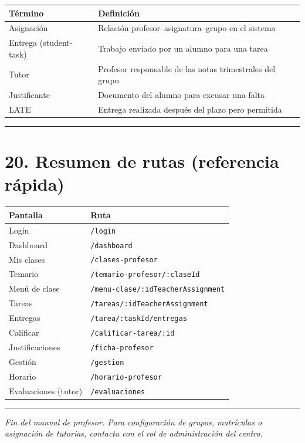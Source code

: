\documentclass[
  spanish,
  11pt,
]{report}
\newcounter{none} %
\begin{document}
{\def\LTcaptype{none} %
\begin{longtable}[]{@{}
  >{\raggedright\arraybackslash}p{}
  >{\raggedright\arraybackslash}p{}@{}}
\toprule\noalign{}
\begin{minipage}[b]{\linewidth}\raggedright
Término
\end{minipage} & \begin{minipage}[b]{\linewidth}\raggedright
Definición
\end{minipage} \\
\midrule\noalign{}
\endhead
\bottomrule\noalign{}
\endlastfoot
Asignación & Relación profesor--asignatura--grupo en el sistema \\
Entrega (student-task) & Trabajo enviado por un alumno para una tarea \\
Tutor & Profesor responsable de las notas trimestrales del grupo \\
Justificante & Documento del alumno para excusar una falta \\
LATE & Entrega realizada después del plazo pero permitida \\
\end{longtable}
}

\begin{center}\rule{0.5\linewidth}{0.5pt}\end{center}

\section{20. Resumen de rutas (referencia
rápida)}\label{resumen-de-rutas-referencia-ruxe1pida}

{\def\LTcaptype{none} %
\begin{longtable}[]{@{}ll@{}}
\toprule\noalign{}
Pantalla & Ruta \\
\midrule\noalign{}
\endhead
\bottomrule\noalign{}
\endlastfoot
Login & \texttt{/login} \\
Dashboard & \texttt{/dashboard} \\
Mis clases & \texttt{/clases-profesor} \\
Temario & \texttt{/temario-profesor/:claseId} \\
Menú de clase & \texttt{/menu-clase/:idTeacherAssignment} \\
Tareas & \texttt{/tareas/:idTeacherAssignment} \\
Entregas & \texttt{/tarea/:taskId/entregas} \\
Calificar & \texttt{/calificar-tarea/:id} \\
Justificaciones & \texttt{/ficha-profesor} \\
Gestión & \texttt{/gestion} \\
Horario & \texttt{/horario-profesor} \\
Evaluaciones (tutor) & \texttt{/evaluaciones} \\
\end{longtable}
}

\begin{center}\rule{0.5\linewidth}{0.5pt}\end{center}

\emph{Fin del manual de profesor. Para configuración de grupos,
matrículas o asignación de tutorías, contacta con el rol de
administración del centro.}
\end{document}

